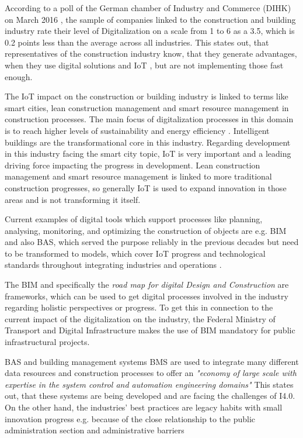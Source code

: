 
According to a poll of the German chamber of Industry and Commerce (\ac{DIHK}) on March 2016 \cite[]{barometer:2016}, the sample of companies linked to the construction and building industry rate their level of Digitalization on a scale from 1 to 6 as a 3.5, which is 0.2 points less than the average across all industries.\cite[p.5]{barometer:2016} This states out, that representatives of the construction industry know, that they generate advantages, when they use digital solutions and \ac{IoT} \cite[p.7-8]{barometer:2016}, but are not implementing those fast enough.

The \ac{IoT} impact on the construction or building industry is linked to terms like smart cities, lean construction management and smart resource management in construction processes. The main focus of digitalization processes in this domain is to reach higher levels of sustainability and energy efficiency \cite{Lilis2017473}.
Intelligent buildings are the transformational core in this industry. Regarding development in this industry facing the smart city topic, \ac{IoT} is very important and a leading driving force impacting the progress in development. Lean construction management and smart resource management is linked to more traditional construction progresses, so generally \ac{IoT} is used to expand innovation in those areas and is not transforming it itself.

Current examples of digital tools which support processes like planning, analysing, monitoring, and optimizing the construction of objects are e.g. \ac{BIM} and also \ac{BAS}, which served the purpose reliably in the previous decades but need to be transformed to models, which cover \ac{IoT} progress and technological standards throughout integrating industries and operations \cite{Lilis2017473}.

The \ac{BIM} and specifically the \emph{road map for digital Design and Construction} \cite{FederalMinRoadMapConstruction}
are frameworks, which can be used to get digital processes involved in the industry regarding holistic perspectives or progress. To get this in connection to the current impact of the digitalization on the industry, the Federal Ministry of Transport and Digital Infrastructure makes the use of BIM mandatory for public infrastructural projects.\cite{FederalMinRoadMapConstruction}

\ac{BAS} and building management systems \ac{BMS} are used to integrate many different data resources and construction processes to offer an \emph{"economy of large scale with expertise in the system control and automation engineering domains"} \cite[p.475]{Lilis2017473} %
This states out, that these systems are being developed and are facing the challenges of \ac{I4.0}. On the other hand, the industries' best practices are legacy habits with small innovation progress e.g. because of the close relationship to the public administration section and administrative barriers \cite{Oesterreich2016121}


